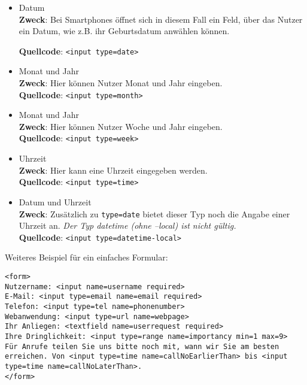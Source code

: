 \begin{itemize}
	\item Datum\\

	\textbf{Zweck}: Bei Smartphones öffnet sich in diesem Fall ein Feld, über das Nutzer ein Datum, wie z.B. ihr Geburtsdatum anwählen können.
	
	\textbf{Quellcode}: \verb|<input type=date>|\\

	\item Monat und Jahr\\

	\textbf{Zweck}: Hier können Nutzer Monat und Jahr eingeben.\\
	
	\textbf{Quellcode}: \verb|<input type=month>|\\

	\item Monat und Jahr\\

	\textbf{Zweck}: Hier können Nutzer Woche und Jahr eingeben.\\
	
	\textbf{Quellcode}: \verb|<input type=week>|\\

	\item Uhrzeit\\
	
	\textbf{Zweck}: Hier kann eine Uhrzeit eingegeben werden.\\
	
	\textbf{Quellcode}: \verb|<input type=time>|\\

	\item Datum und Uhrzeit\\

	\textbf{Zweck}: Zusätzlich zu \verb|type=date| bietet dieser Typ noch die Angabe einer Uhrzeit an. \emph{Der Typ datetime (ohne –local) ist nicht gültig.}\\

	\textbf{Quellcode}: \verb|<input type=datetime-local>|\\
\end{itemize}

Weiteres Beispiel für ein einfaches Formular:

\begin{verbatim}
<form>
Nutzername: <input name=username required>
E-Mail: <input type=email name=email required>
Telefon: <input type=tel name=phonenumber>
Webanwendung: <input type=url name=webpage>
Ihr Anliegen: <textfield name=userrequest required>
Ihre Dringlichkeit: <input type=range name=importancy min=1 max=9>
Für Anrufe teilen Sie uns bitte noch mit, wann wir Sie am besten erreichen. Von <input type=time name=callNoEarlierThan> bis <input type=time name=callNoLaterThan>.
</form>
\end{verbatim}


